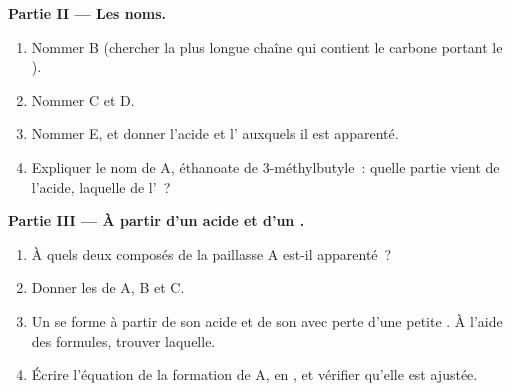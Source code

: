 \begin{problem}
\medskip
\noindent\textbf{Partie II --- Les noms.}
\begin{enumerate}[resume]
  \item Nommer B (chercher la plus longue chaîne qui contient le carbone
        portant le ).
  \item Nommer C et D.
  \item Nommer E, et donner l'acide et l' auxquels il est
        apparenté.
  \item Expliquer le nom de A, éthanoate de 3-méthylbutyle~: quelle
        partie vient de l'acide, laquelle de l'~?
\end{enumerate}

\medskip
\noindent\textbf{Partie III --- À partir d'un acide et d'un .}
\begin{enumerate}[resume]
  \item À quels deux composés de la paillasse A est-il apparenté~?
  \item Donner les  de A, B et C.
  \item Un  se forme à partir de son acide et de son  avec
        perte d'une petite . À l'aide des formules, trouver
        laquelle.
  \item Écrire l'équation de la formation de A, en , et
        vérifier qu'elle est ajustée.
\end{enumerate}


\end{problem}
